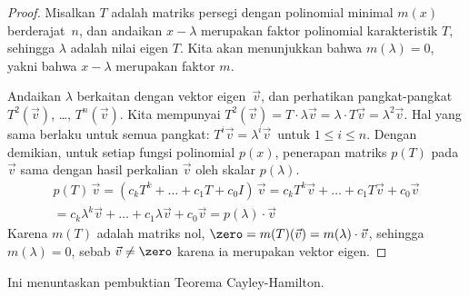 \begin{proof}
Misalkan \( T \) adalah matriks persegi dengan polinomial minimal \( m(x) \)
berderajat~\( n \), dan
andaikan \( x-\lambda \) merupakan faktor polinomial karakteristik
\( T \), sehingga \( \lambda \) adalah nilai eigen \( T \).
Kita akan menunjukkan bahwa $m(\lambda)=0$, yakni bahwa $x-\lambda$ merupakan faktor $m$.

Andaikan $\lambda$ berkaitan dengan vektor eigen~$\vec{v}$, dan
perhatikan pangkat-pangkat $T^2(\vec{v})$, \ldots, \( T^n(\vec{v}) \).
Kita mempunyai
$T^2(\vec{v})
=T\cdot\lambda\vec{v}=\lambda\cdot T\vec{v}=\lambda^2\vec{v}$.
Hal yang sama berlaku untuk semua pangkat:
$T^i\vec{v}=\lambda^i\vec{v}\,$ untuk \( 1\leq i \leq n \).
Dengan demikian,
untuk setiap fungsi polinomial \( p(x) \), penerapan matriks \( p(T) \)
pada \( \vec{v} \) sama dengan hasil perkalian \( \vec{v} \) oleh skalar
\( p(\lambda) \).
\begin{multline*}
  p(T)\,\vec{v}
  =(c_kT^k+\dots+c_1T+c_0I)\,\vec{v}
  =c_kT^k\vec{v}+\dots+c_1T\vec{v}+c_0\vec{v}  \\
  =c_k\lambda^k\vec{v}+\dots+c_1\lambda\vec{v}+c_0\vec{v}
  =p(\lambda)\cdot\vec{v}
\end{multline*}
Karena \( m(T) \) adalah matriks nol,
\( \zero=m(T)(\vec{v})=m(\lambda)\cdot\vec{v} \), sehingga
\( m(\lambda)=0 \), sebab \( \vec{v}\neq\zero \)
karena ia merupakan vektor eigen.
\end{proof}

Ini menuntaskan pembuktian Teorema Cayley-Hamilton.

